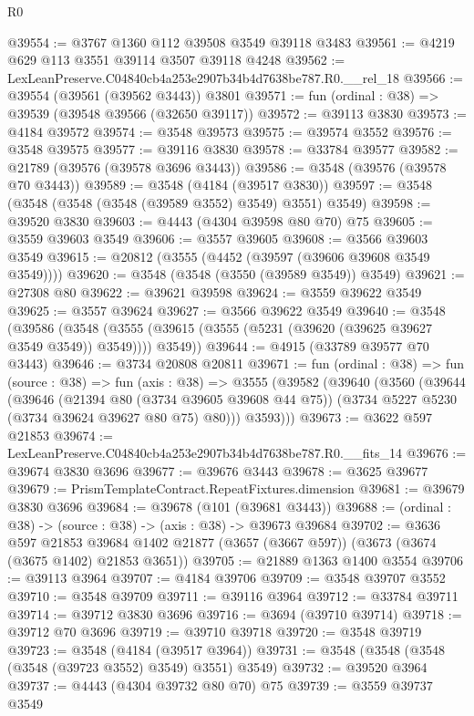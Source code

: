 \begin{lexlean}{R0}
\begin{coremodule}
@39554 := @3767 @1360 @112 @39508 @3549 @39118 @3483
@39561 := @4219 @629 @113 @3551 @39114 @3507 @39118 @4248
@39562 := LexLeanPreserve.C04840cb4a253e2907b34b4d7638be787.R0.__rel_18
@39566 := @39554 (@39561 (@39562 @3443)) @3801
@39571 := fun (ordinal : @38) => @39539 (@39548 @39566 (@32650 @39117))
@39572 := @39113 @3830
@39573 := @4184 @39572
@39574 := @3548 @39573
@39575 := @39574 @3552
@39576 := @3548 @39575
@39577 := @39116 @3830
@39578 := @33784 @39577
@39582 := @21789 (@39576 (@39578 @3696 @3443))
@39586 := @3548 (@39576 (@39578 @70 @3443))
@39589 := @3548 (@4184 (@39517 @3830))
@39597 := @3548 (@3548 (@3548 (@3548 (@39589 @3552) @3549) @3551) @3549)
@39598 := @39520 @3830
@39603 := @4443 (@4304 @39598 @80 @70) @75
@39605 := @3559 @39603 @3549
@39606 := @3557 @39605
@39608 := @3566 @39603 @3549
@39615 := @20812 (@3555 (@4452 (@39597 (@39606 @39608 @3549 @3549))))
@39620 := @3548 (@3548 (@3550 (@39589 @3549)) @3549)
@39621 := @27308 @80
@39622 := @39621 @39598
@39624 := @3559 @39622 @3549
@39625 := @3557 @39624
@39627 := @3566 @39622 @3549
@39640 := @3548
    (@39586
      (@3548 (@3555 (@39615 (@3555 (@5231 (@39620 (@39625 @39627 @3549 @3549)) @3549)))) @3549))
@39644 := @4915 (@33789 @39577 @70 @3443)
@39646 := @3734 @20808 @20811
@39671 := fun (ordinal : @38) =>
  fun (source : @38) =>
  fun (axis : @38) =>
  @3555
    (@39582
      (@39640
        (@3560
          (@39644
            (@39646
              (@21394 @80 (@3734 @39605 @39608 @44 @75))
              (@3734 @5227 @5230 (@3734 @39624 @39627 @80 @75) @80)))
          @3593)))
@39673 := @3622 @597 @21853
@39674 := LexLeanPreserve.C04840cb4a253e2907b34b4d7638be787.R0.__fits_14
@39676 := @39674 @3830 @3696
@39677 := @39676 @3443
@39678 := @3625 @39677
@39679 := PrismTemplateContract.RepeatFixtures.dimension
@39681 := @39679 @3830 @3696
@39684 := @39678 (@101 (@39681 @3443))
@39688 := (ordinal : @38) -> (source : @38) -> (axis : @38) -> @39673 @39684
@39702 := @3636
    @597
    @21853
    @39684
    @1402
    @21877
    (@3657 (@3667 @597))
    (@3673 (@3674 (@3675 @1402) @21853 @3651))
@39705 := @21889 @1363 @1400 @3554
@39706 := @39113 @3964
@39707 := @4184 @39706
@39709 := @3548 @39707 @3552
@39710 := @3548 @39709
@39711 := @39116 @3964
@39712 := @33784 @39711
@39714 := @39712 @3830 @3696
@39716 := @3694 (@39710 @39714)
@39718 := @39712 @70 @3696
@39719 := @39710 @39718
@39720 := @3548 @39719
@39723 := @3548 (@4184 (@39517 @3964))
@39731 := @3548 (@3548 (@3548 (@3548 (@39723 @3552) @3549) @3551) @3549)
@39732 := @39520 @3964
@39737 := @4443 (@4304 @39732 @80 @70) @75
@39739 := @3559 @39737 @3549

\end{coremodule}
\end{lexlean}
